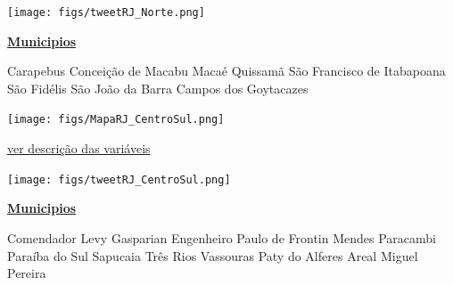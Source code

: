 \documentclass[10pt]{article} %
\begin{document}
\begin{minipage}[t]{.66\linewidth}
\begin{center}
\texttt{[image: figs/tweetRJ\_Norte.png]}\end{center}
\end{minipage}\hfill\begin{minipage}[t]{.30\linewidth}
\begin{mdframed}[style=sidebar,frametitle={}]
\textbf{\hyperlink{municips}{Municipios}}\begin{itemize}\gsquare Carapebus 
\gsquare Conceição de Macabu 
\gsquare Macaé 
\gsquare Quissamã 
\gsquare São Francisco de Itabapoana 
\gsquare São Fidélis 
\gsquare São João da Barra 
\gsquare Campos dos Goytacazes 
\end{itemize}\BackToContents\end{mdframed}\hfill\end{minipage}\newpage\begin{minipage}[t]{.66\linewidth}
\hypertarget{CntS}{}
\texttt{[image: figs/MapaRJ\_CentroSul.png]}\vspace{0.5cm}\begin{center}

\end{center}
\small{\hyperlink{vartab}{ver descrição das variáveis}}\vspace{0.5cm}\begin{center}
\texttt{[image: figs/tweetRJ\_CentroSul.png]}\end{center}
\end{minipage}\hfill\begin{minipage}[t]{.30\linewidth}
\begin{mdframed}[style=sidebar,frametitle={}]
\textbf{\hyperlink{municips}{Municipios}}\begin{itemize}\gsquare Comendador Levy Gasparian 
\gsquare Engenheiro Paulo de Frontin 
\gsquare Mendes 
\gsquare Paracambi 
\gsquare Paraíba do Sul 
\gsquare Sapucaia 
\gsquare Três Rios 
\gsquare Vassouras 
\gsquare Paty do Alferes 
\gsquare Areal 
\gsquare Miguel Pereira 
\end{itemize}\BackToContents\end{mdframed}\hfill\end{minipage}\newpage\begin{minipage}[t]{.66\linewidth}

\end{minipage}
\end{document}
